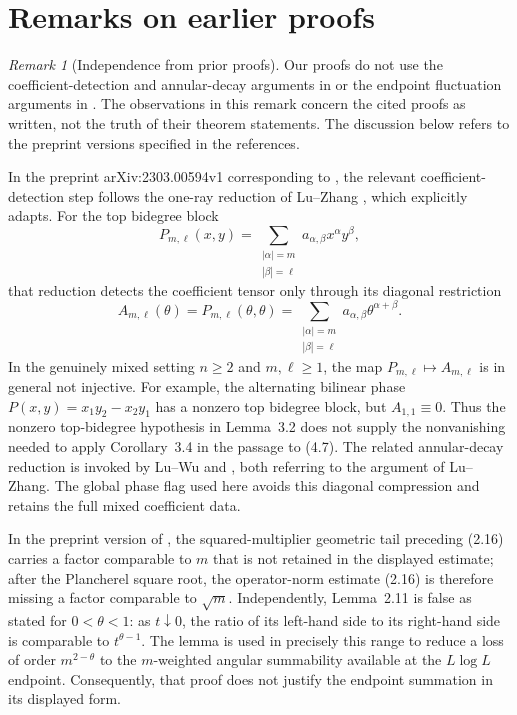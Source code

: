 \documentclass[11pt]{article}
\numberwithin{equation}{section}
\theoremstyle{remark}
\newtheorem{remark}[theorem]{Remark}
\theoremstyle{definition}
\begin{document}
\section{Remarks on earlier proofs}\label{sec:earlier-proofs}
\begin{remark}[Independence from prior proofs]\label{rem:proof-status}
Our proofs do not use the coefficient-detection and annular-decay
arguments in
\cite{AlSalman,CSS,JiangLu,LuWu03,LuWu04,LuZhang} or the endpoint
fluctuation arguments in \cite{DHL,BhojakShrivastava}.  The observations in
this remark concern the cited proofs as written, not the truth of their
theorem statements.  The discussion below refers to the preprint versions specified in
the references.

In the preprint arXiv:2303.00594v1 corresponding to \cite{CSS},
the relevant coefficient-detection step follows the one-ray reduction of
Lu--Zhang \cite[pp.~210--213]{LuZhang}, which \cite[Lemma~3.2]{CSS}
explicitly adapts.  For the top bidegree block
\[
 P_{m,\ell}(x,y)
 =\sum_{\substack{|\alpha|=m\\|\beta|=\ell}}
   a_{\alpha,\beta}x^\alpha y^\beta,
\]
that reduction detects the coefficient tensor only through its diagonal
restriction
\[
 A_{m,\ell}(\theta)=P_{m,\ell}(\theta,\theta)
 =\sum_{\substack{|\alpha|=m\\|\beta|=\ell}}
   a_{\alpha,\beta}\theta^{\alpha+\beta}.
\]
In the genuinely mixed setting $n\ge2$ and $m,\ell\ge1$, the map
$P_{m,\ell}\mapsto A_{m,\ell}$ is in general not injective.  For example,
the alternating bilinear phase $P(x,y)=x_1y_2-x_2y_1$ has a nonzero top
bidegree block, but $A_{1,1}\equiv0$.  Thus the nonzero top-bidegree
hypothesis in Lemma~3.2 does not supply the nonvanishing needed to apply
Corollary~3.4 in the passage to (4.7).
The related annular-decay reduction is invoked by Lu--Wu
\cite[p.~54, (3.1)]{LuWu03} and \cite[p.~308, Lemma~4]{LuWu04},
both referring to the argument of Lu--Zhang.  The global phase flag used here avoids this
diagonal compression and retains the full mixed coefficient data.

In the preprint version of \cite{DHL}, the squared-multiplier geometric
tail preceding (2.16)
carries a factor comparable to $m$ that is not retained in the displayed
estimate; after the Plancherel square root, the operator-norm estimate
(2.16) is therefore missing a factor comparable to $\sqrt m$.
Independently, Lemma~2.11 is false as stated for $0<\theta<1$: as
$t\downarrow0$, the ratio of its left-hand side to its right-hand side is
comparable to $t^{\theta-1}$.  The lemma is used in precisely this range to
reduce a loss of order $m^{2-\theta}$ to the $m$-weighted angular
summability available at the $L\log L$ endpoint.  Consequently, that
proof does not justify the endpoint summation in its displayed form.


\end{remark}
\end{document}
